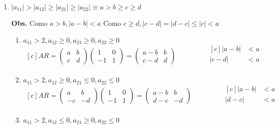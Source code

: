 \documentclass{article}
\newcommand\tab[1][0.6cm]{\hspace*{#1}}
\newcommand\nl{\newline\tab}
\begin{document}
	\begin{enumerate}
		\item  
		$|a_{11}| > |a_{12}| \geq |a_{21}| \geq |a_{22}|   \equiv a > b \geq c \geq d$ \nl
		
		\textbf{Obs.} \nl Como $a > b, |a - b| < a$ \nl
						  Como $c \geq d, |c - d| = |d - c|\leq |c| < a$ 
		\begin{enumerate}
			\item $a_{11} > 2, a_{12} \geq 0, a_{21} \geq 0, a_{22} \geq 0$\nl
			$$
			\begin{aligned}[c]
			AR = 
			\begin{pmatrix}
			a & b \\
			c & d 
			\end{pmatrix} 
			\begin{pmatrix}
			1 & 0 \\
			-1 & 1 
			\end{pmatrix} = 
			\begin{pmatrix}
			a-b & b \\
			c-d & d 
			\end{pmatrix}
			\end{aligned}
			\qquad\qquad
			\begin{aligned}[c]
			|a - b| &< a\\
			|c - d| &< a\\
			\end{aligned}
			$$
			\item $a_{11} > 2, a_{12} \geq 0, a_{21} \leq 0, a_{22} \leq 0$ \nl
			$$
			\begin{aligned}[c]
			AR = 
			\begin{pmatrix}
			a & b \\
			-c & -d 
			\end{pmatrix} 
			\begin{pmatrix}
			1 & 0 \\
			-1 & 1 
			\end{pmatrix} = 
			\begin{pmatrix}
			a-b & b \\
			d-c & -d 
			\end{pmatrix}
			\end{aligned}
			\qquad\qquad
			\begin{aligned}[c]
			|a - b| &< a\\
			|d - c| &< a\\
			\end{aligned}
			$$
			\item $a_{11} > 2, a_{12} \leq 0, a_{21} \geq 0, a_{22} \leq 0$ \nl

\end{enumerate}
\end{enumerate}
\end{document}
